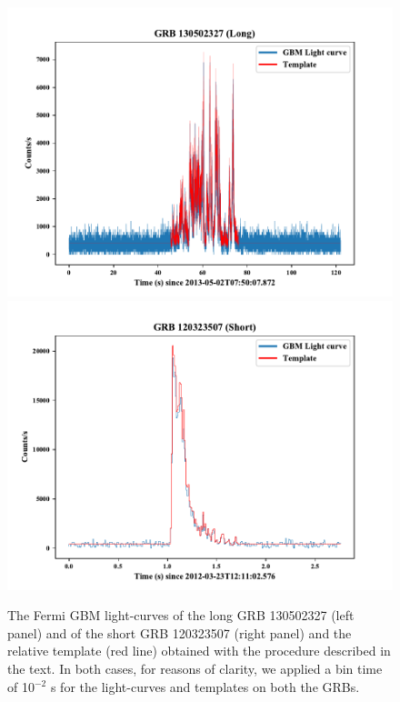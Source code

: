 \documentclass[]{spie}  %
\begin{document}
\begin{figure}[h!]
\centering
\includegraphics[scale=0.52,angle=0]{fig/Template_comparison_Long.pdf}
\includegraphics[scale=0.52,angle=0]{fig/Template_comparison_Short.pdf}

\caption{The Fermi GBM light-curves of the long GRB 130502327 (left panel) and of the short GRB 120323507 (right panel) and the relative template (red line) obtained with the procedure described in the text. In both cases, for reasons of clarity, we applied a bin time of 10$^{-2}$ s for the light-curves and templates on both the GRBs.} 
\label{fig:template_short_long}
\end{figure}
\end{document}
